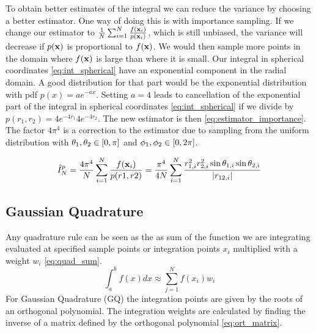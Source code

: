 To obtain better estimates of the integral we can reduce the variance by
choosing a better estimator.
One way of doing this is with importance sampling. If we change our estimator to
$\frac{1}{N} \sum_{i=1}^{N} \frac{f(\mathbf{x}_i)}{p(\mathbf{x}_i)}$, which is still unbiased, the
variance will decrease if $p(\mathbf{x})$ is proportional to $f(\mathbf{x})$. We would then sample
more points in the domain where $f(\mathbf{x})$ is large than where it is small.
Our integral in spherical coordinates \cref{eq:int_spherical} have an exponential
component in the radial domain. A good distribution for that part would be
the exponential distribution with pdf $p(x) = ae^{-ax}$.
Setting $a = 4$ leads to cancellation of the exponential part of the integral in
spherical coordinates \cref{eq:int_spherical} if we divide by
$p(r_1,r_2) = 4e^{-4r_1} 4e^{-4r_2}$. The new estimator is then
\cref{eq:estimator_importance}. The factor $4\pi^4$ is a correction to the estimator due to sampling from the
uniform distribution with $\theta_1, \theta_2 \in \left[0, \pi\right]$ and
$\phi_1, \phi_2 \in \left[0, 2\pi\right]$.

\begin{equation}
  \label{eq:estimator_importance}
  \hat{I}_N^p
  = \frac{4\pi^4}{N} \sum_{i=1}^{N} \frac{f(\mathbf{x}_i)}{p(r1,r2)}
  = \frac{\pi^4}{4N} \sum_{i=1}^{N}
  \frac{r_{1,i}^2 r_{2,i}^2 \sin{\theta_{1,i}} \sin{\theta_{2,i}}}{\abs{r_{12,i}}}
\end{equation}


\subsection{Gaussian Quadrature}
Any quadrature rule can be seen as the as sum of the function we are  
integrating evaluated at specified sample points or integration points $x_i$
multiplied with a weight $w_i$ \cref{eq:quad_sum}.
\begin{equation}\label{eq:quad_sum}
  \int_{a}^{b} f(x)dx \approx \sum_{j=1}^{N} f(x_i) w_i
\end{equation}
For Gaussian Quadrature (GQ) the
integration points are given by the roots of an orthogonal polynomial. The
integration weights are calculated by finding the inverse of a matrix defined by
the orthogonal polynomial \cref{eq:ort_matrix}.       

